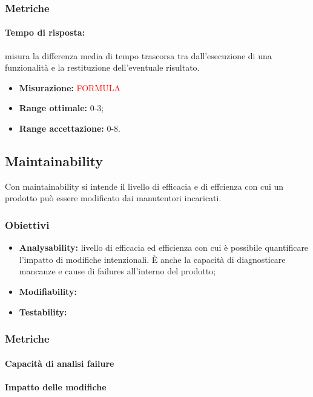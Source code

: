 		\subsubsection{Metriche}
			\paragraph{Tempo di risposta:} misura la differenza media di tempo trascorsa tra dall’esecuzione di una funzionalità e la restituzione dell’eventuale risultato.
			\begin{itemize}
				\item {\textbf{Misurazione:} \textcolor{red}{FORMULA}}
				\item {\textbf{Range ottimale:} 0-3;}
				\item {\textbf{Range accettazione:} 0-8.}
			\end{itemize} 
			
	\subsection{Maintainability}
		Con maintainability si intende il livello di efficacia e di effcienza con cui un prodotto può essere modificato dai manutentori incaricati.
		\subsubsection{Obiettivi}
		\begin{itemize}
			\item {\textbf{Analysability:} livello di efficacia ed efficienza con cui è possibile quantificare l'impatto di modifiche intenzionali. È anche la capacità di diagnosticare mancanze e cause di failures all'interno del prodotto; }
			\item{\textbf{Modifiability:} }
			\item{\textbf{Testability:} }
		\end{itemize}
		\subsubsection{Metriche}
			\paragraph{Capacità di analisi failure}
			\paragraph{Impatto delle modifiche}
